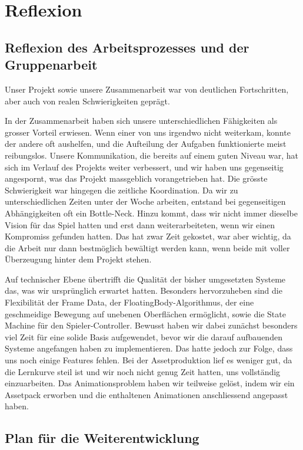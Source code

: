 \documentclass[../Main.tex]{subfiles}
\begin{document}
\section{Reflexion}

\subsection{Reflexion des Arbeitsprozesses und der Gruppenarbeit}

Unser Projekt sowie unsere Zusammenarbeit war von deutlichen Fortschritten, aber auch von realen Schwierigkeiten geprägt.

In der Zusammenarbeit haben sich unsere unterschiedlichen Fähigkeiten als grosser Vorteil erwiesen. Wenn einer von uns irgendwo nicht weiterkam, konnte der andere oft aushelfen, und die Aufteilung der Aufgaben funktionierte meist reibungslos. Unsere Kommunikation, die bereits auf einem guten Niveau war, hat sich im Verlauf des Projekts weiter verbessert, und wir haben uns gegenseitig angespornt, was das Projekt massgeblich vorangetrieben hat. Die grösste Schwierigkeit war hingegen die zeitliche Koordination. Da wir zu unterschiedlichen Zeiten unter der Woche arbeiten, entstand bei gegenseitigen Abhängigkeiten oft ein Bottle-Neck. Hinzu kommt, dass wir nicht immer dieselbe Vision für das Spiel hatten und erst dann weiterarbeiteten, wenn wir einen Kompromiss gefunden hatten. Das hat zwar Zeit gekostet, war aber wichtig, da die Arbeit nur dann bestmöglich bewältigt werden kann, wenn beide mit voller Überzeugung hinter dem Projekt stehen.

Auf technischer Ebene übertrifft die Qualität der bisher umgesetzten Systeme das, was wir ursprünglich erwartet hatten. Besonders hervorzuheben sind die Flexibilität der Frame Data, der FloatingBody-Algorithmus, der eine geschmeidige Bewegung auf unebenen Oberflächen ermöglicht, sowie die State Machine für den Spieler-Controller. Bewusst haben wir dabei zunächst besonders viel Zeit für eine solide Basis aufgewendet, bevor wir die darauf aufbauenden Systeme angefangen haben zu implementieren. Das hatte jedoch zur Folge, dass uns noch einige Features fehlen. Bei der Assetproduktion lief es weniger gut, da die Lernkurve steil ist und wir noch nicht genug Zeit hatten, uns vollständig einzuarbeiten. Das Animationsproblem haben wir teilweise gelöst, indem wir ein Assetpack erworben und die enthaltenen Animationen anschliessend angepasst haben.

\subsection{Plan für die Weiterentwicklung}
\end{document}
